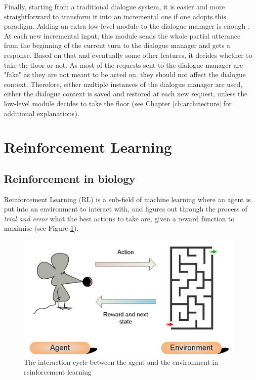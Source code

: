 				Finally, starting from a traditional dialogue system, it is easier and more straightforward to transform it into an incremental one if one adopts this paradigm. Adding an extra low-level module to the dialogue manager is enough \cite{Selfridge2012a}. At each new incremental input, this module sends the whole partial utterance from the beginning of the current turn to the dialogue manager and gets a response. Based on that and eventually some other features, it decides whether to take the floor or not. As most of the requests sent to the dialogue manager are "fake" as they are not meant to be acted on, they should not affect the dialogue context. Therefore, either multiple instances of the dialogue manager are used, either the dialogue context is saved and restored at each new request, unless the low-level module decides to take the floor (see Chapter \ref{ch:architecture} for additional explanations).

\section{Reinforcement Learning}
\label{soa:rl}

	\subsection{Reinforcement in biology}
    
		Reinforcement Learning (RL) is a sub-field of machine learning where an agent is put into an environment to interact with, and figures out through the process of \textit{trial and error} what the best actions to take are, given a reward function to maximise \cite{Sutton1998} (see Figure \ref{fig:rlscheme}).
			
			\begin{figure}[ht]
				\centering
				\includegraphics[scale=0.8]{figures/AgentEnv.pdf}
				\caption{The interaction cycle between the agent and the environment in reinforcement learning}
				\label{fig:rlscheme}
			\end{figure}
			
